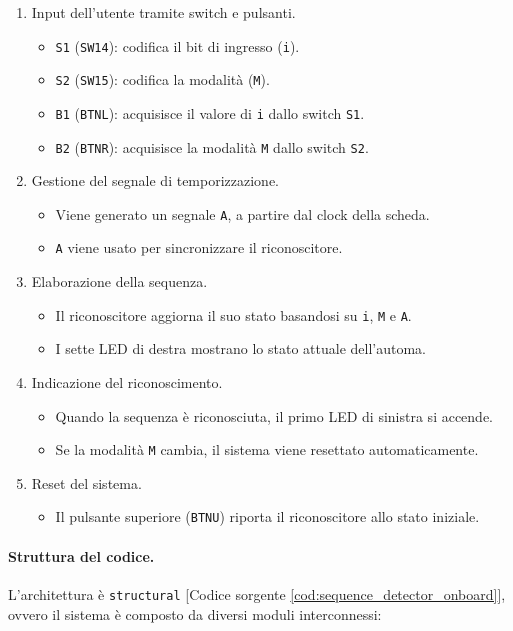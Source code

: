 \begin{enumerate}
    \item Input dell'utente tramite switch e pulsanti.
    \begin{itemize}
        \item \texttt{S1} (\texttt{SW14}): codifica il bit di ingresso (\texttt{i}).
        \item \texttt{S2} (\texttt{SW15}): codifica la modalità (\texttt{M}).
        \item \texttt{B1} (\texttt{BTNL}): acquisisce il valore di \texttt{i} dallo switch \texttt{S1}.
        \item \texttt{B2} (\texttt{BTNR}): acquisisce la modalità \texttt{M} dallo switch \texttt{S2}.
    \end{itemize}
    \item Gestione del segnale di temporizzazione.
    \begin{itemize}
        \item Viene generato un segnale \texttt{A}, a partire dal clock della scheda.
        \item \texttt{A} viene usato per sincronizzare il riconoscitore.
    \end{itemize}
    \item Elaborazione della sequenza.
    \begin{itemize}
        \item Il riconoscitore aggiorna il suo stato basandosi su \texttt{i}, \texttt{M} e \texttt{A}.
        \item I sette LED di destra mostrano lo stato attuale dell'automa.
    \end{itemize}
    \item Indicazione del riconoscimento.
    \begin{itemize}
        \item Quando la sequenza è riconosciuta, il primo LED di sinistra si accende.
        \item Se la modalità \texttt{M} cambia, il sistema viene resettato automaticamente.
    \end{itemize}
    \item Reset del sistema.
    \begin{itemize}
        \item Il pulsante superiore (\texttt{BTNU}) riporta il riconoscitore allo stato iniziale.
    \end{itemize}
\end{enumerate}

\paragraph{Struttura del codice.}
L’architettura è \texttt{structural} [Codice sorgente \ref{cod:sequence_detector_onboard}], ovvero il sistema è composto da diversi moduli interconnessi:

